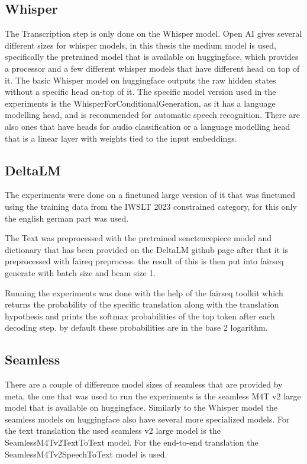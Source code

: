 \subsection{Whisper}
The Transcription step is only done on the Whisper model.
Open AI gives several different sizes for whisper models, in this thesis the medium model is used, specifically the pretrained model that is available on huggingface, which provides a processor and a few different whisper models that have different head on top of it.
The basic Whisper model on huggingface outputs the raw hidden states without a specific head on-top of it. 
The specific model version used in the experiments is the WhisperForConditionalGeneration, as it has a language modelling head, and is recommended for automatic speech recognition. There are also ones that have heads for audio classification or a language modelling head that is a linear layer with weights tied to the input embeddings. 
 
\subsection{DeltaLM}
The experiments \cite{ma2021deltalm} were done on a finetuned large version of it that was finetuned using the training data from the IWSLT 2023 constrained category, for this only the english german part was used.

The Text was preprocessed with the pretrained senctencepiece model and dictionary that has been provided on the DeltaLM github page \cite{deltalmurl} after that it is preprocessed with faireq preprocess. the result of this is then put into fairseq generate with batch size and beam size 1. 

 Running the experiments was done with the help of the fairseq toolkit \cite{ott2019fairseqfastextensibletoolkit} which returns the probability of the specific translation along with the translation hypothesis and prints the softmax probabilities of the top token after each decoding step. by default these probabilities are in the base 2 logarithm. 

 
\subsection{Seamless}
There are a couple of difference model sizes of seamless that are provided by meta, the one that was used to run the experiments is the seamless M4T v2 large model that is available on huggingface. Similarly to the Whisper model the seamless models on huggingface also have several more specialized models. 
For the text translation the used seamless v2 large model is the SeamlessM4Tv2TextToText model.
For the end-to-end translation the SeamlessM4Tv2SpeechToText model is used. 

